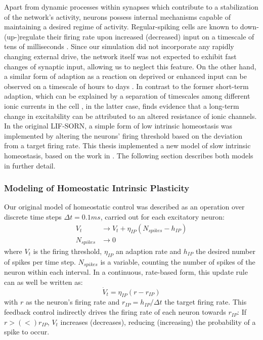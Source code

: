 \documentclass[10pt,a4paper]{article}
\begin{document}
Apart from dynamic processes within synapses which contribute to a stabilization of the network's activity, neurons possess internal mechanisms capable of maintaining a desired regime of activity. Regular-spiking cells are known to down-(up-)regulate their firing rate upon increased (decreased) input on a timescale of tens of milliseconds \cite{Connors_Gutnick_Spike_Patterns,Benda_Herz_Spike_Frequ_Adaption}. Since our simulation did not incorporate any rapidly changing external drive, the network itself was not expected to exhibit fast changes of synaptic input, allowing us to neglect this feature. On the other hand, a similar form of adaption as a reaction on deprived or enhanced input can be observed on a timescale of hours to days \cite{Desai_IP}. In contrast to the former short-term adaption, which can be explained by a separation of timescales among different ionic currents in the cell \cite[p.~252-256]{Izhikevich_Dynsys}, in the latter case, \cite{Desai_IP} finds evidence that a long-term change in excitability can be attributed to an altered resistance of ionic channels. In the original LIF-SORN, a simple form of low intrinsic homeostasis was implemented by altering the neurons' firing threshold based on the deviation from a target firing rate. This thesis implemented a new model of slow intrinsic homeostasis, based on the work in \cite{Sweeney_Paper}. The following section describes both models in further detail.
\subsubsection{Modeling of Homeostatic Intrinsic Plasticity}

Our original model of homeostatic control was described as an operation over discrete time steps $\Delta t = 0.1ms$, carried out for each excitatory neuron:
\begin{align}
V_t &\rightarrow V_t + \eta_{IP} (N_{spikes} - h_{IP}) \label{can_hom_1}\\
N_{spikes} &\rightarrow 0 \label{can_hom_2}
\end{align}
where $V_t$ is the firing threshold, $\eta_{IP}$ an adaption rate and $h_{IP}$ the desired number of spikes per time step. $N_{spikes}$ is a variable, counting the number of spikes of the neuron within each interval. In a continuous, rate-based form, this update rule can as well be written as:
\begin{equation}
\dot{V}_t = \eta_{IP}(r-r_{IP}) \label{can_hom_rate}
\end{equation}
with $r$ as the neuron's firing rate and $r_{IP}=h_{IP}/\Delta t$ the target firing rate. This feedback control indirectly drives the firing rate of each neuron towards $r_{IP}$: If $r>(<)r_{IP}$, $V_t$ increases (decreases), reducing (increasing) the probability of a spike to occur. 
\end{document}
